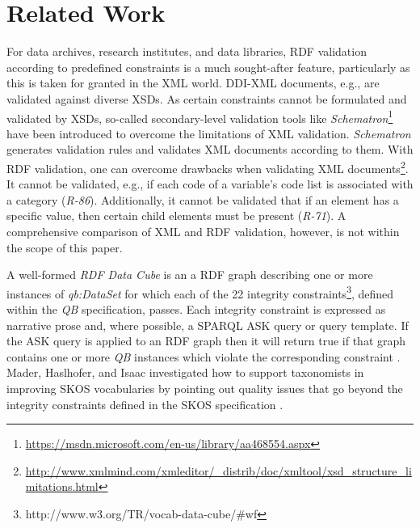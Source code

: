 \documentclass{llncs}
\begin{document}
{\section{Related Work}

For data archives, research institutes, and data libraries,
RDF validation according to predefined constraints is a much sought-after feature, 
particularly as this is taken for granted in the XML world.
DDI-XML documents, e.g., are validated against diverse XSDs\footnotemark[\ref{fnt:DDI-XSDs}].
As certain constraints cannot be formulated and validated by XSDs, 
so-called secondary-level validation tools like \emph{Schematron}\footnote{\url{https://msdn.microsoft.com/en-us/library/aa468554.aspx}} have been introduced to overcome the limitations of XML validation.
\emph{Schematron} generates validation rules and validates XML documents according to them.
With RDF validation, one can overcome drawbacks when validating XML documents\footnote{\url{http://www.xmlmind.com/xmleditor/_distrib/doc/xmltool/xsd_structure_limitations.html}}.
It cannot be validated, e.g., if each code of a variable's code list is associated with a category (\emph{R-86}).
Additionally, it cannot be validated that if an element has a specific value, then certain child elements must be present (\emph{R-71}).  
A comprehensive comparison of XML and RDF validation, however, is not within the scope of this paper.

A well-formed \emph{RDF Data Cube} is an a RDF graph describing one or more instances of \emph{qb:DataSet} for which each of the 22 integrity constraints\footnote{http://www.w3.org/TR/vocab-data-cube/\#wf}, defined within the \emph{QB} specification, passes.
Each integrity constraint is expressed as narrative prose and, where possible, a SPARQL ASK query or query template. 
If the ASK query is applied to an RDF graph then it will return true if that graph contains one or more \emph{QB} instances which violate the corresponding constraint \cite{CyganiakReynolds2014}.
Mader, Haslhofer, and Isaac investigated how to support
taxonomists in improving SKOS vocabularies by pointing out quality
issues that go beyond the integrity constraints defined in the SKOS specification \cite{MaderHaslhoferIsaac2012}.

}
\end{document}
